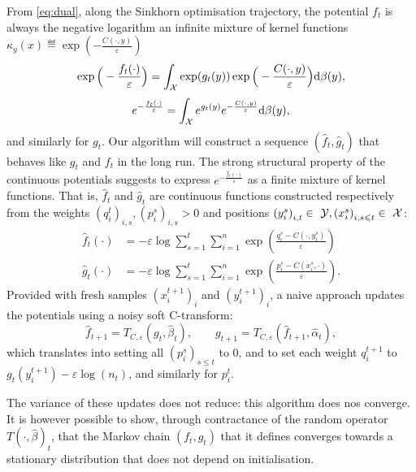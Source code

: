 From \eqref{eq:dual}, along the Sinkhorn optimisation trajectory, the potential $f_t$ is always the negative logarithm an
infinite mixture of kernel functions $\kappa_y(x) \eqdef \exp(-\frac{C(\cdot, y)}{\varepsilon})$
\begin{equation*}
    \exp\Big(-\frac{f_t(\cdot)}{\varepsilon}\Big) = 
    \int_{\mathcal{X}} \exp(g_t(y))  \exp\Big(-\frac{C(\cdot, y)}{\varepsilon}\Big) \textrm{d} \beta(y),
\end{equation*}
\begin{equation*}
    e^{-\frac{f_t(\cdot)}{\varepsilon}} = 
    \int_{\mathcal{X}} e^{g_t(y)}  e^{-\frac{C(\cdot, y)}{\varepsilon}} \textrm{d} \beta(y),
\end{equation*}
and similarly for $g_t$. Our algorithm will construct a sequence $(\hat f_t,
\hat g_t)$ that behaves like $g_t$ and $f_t$ in the long run. The strong
structural property of the continuous potentials suggests to express $e^{-\frac{\hat f_t(\cdot)}{\varepsilon}}$ as a
finite mixture of kernel functions. That is, $\hat f_t$ and $\hat g_t$ are continuous
functions constructed respectively from the weights ${(q_i^t)}_{i,s}, {(p_i^s)}_{i,s} > 0$ and positions
${(y_i^s)}_{i,t} \in~\mathcal{Y}, {(x_i^s)}_{i,s\leqslant t} \in~\mathcal{X}$:
\begin{align}\label{eq:param}
    \hat f_t(\cdot) &= - \varepsilon \log \sum_{s=1}^t \sum_{i=1}^{n} 
    \exp(\frac{q_i^s - C(\cdot, y_i^s)}{\varepsilon}) \\
    \hat g_t(\cdot) &= - \varepsilon \log \sum_{s=1}^t \sum_{i=1}^{n} 
    \exp(\frac{p_i^s - C(x_i^s, \cdot)}{\varepsilon}).
\end{align}
Provided with fresh samples $(x_i^{t+1})_i$ and $(y_i^{t+1})_i$, a naive approach
 updates the potentials using a noisy soft C-transform:
\begin{equation}
    \hat f_{t+1} = T_{C,\varepsilon}(g_t, \hat \beta_t),\qquad g_{t+1} = T_{C,\varepsilon}(\hat f_{t+1}, \hat \alpha_t),
\end{equation}
which translates into setting all $(p_i^s)_{s \leq t}$ to 0, and to set each weight
 $q_i^{t+1}$ to $g_t(y_i^{t+1}) - \varepsilon \log(n_t)$, and similarly for $p_i^t$.

The variance of these updates does not reduce: this algorithm does nos
converge. It is however possible to show, through contractance of the random
operator $T{(\cdot, \hat \beta)}_t$, that the Markov chain $(f_t, g_t)$ that it
defines converges towards a stationary distribution that does not depend on
initialisation.

